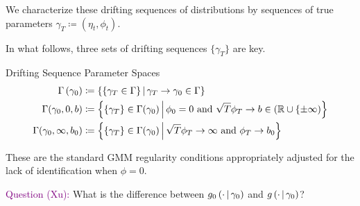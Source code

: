 \documentclass[11pt]{article}
\newcommand{\purple}[1]{\textcolor{purple}{#1}}
\newcommand*{\R}{\mathbb{R}}
\newcommand{\mvert}[1][\middle]{\ensuremath{\,#1\vert\,}}
\begin{document}
We characterize these drifting sequences of distributions by sequences of true parameters $\gamma_T \coloneqq
(\eta_t, \phi_t)$.

In what follows, three sets of drifting sequences $\lbrace \gamma_T \rbrace$ are key. 

\begin{defn}{Drifting Sequence Parameter Spaces}
    \begin{align}
        \Gamma\left(\gamma_0\right) &\coloneqq \left\lbrace \left\lbrace \gamma_T \in \Gamma \right\rbrace \mvert
            \gamma_T \to \gamma_0 \in \Gamma \right\rbrace\\ 
        \Gamma(\gamma_0, 0, b) &\coloneqq \left\lbrace \lbrace \gamma_T \rbrace \in \Gamma(\gamma_0) \mvert \phi_0 =
        0\ \text{and}\ \sqrt{T} \phi_T \to b \in (\R \cup \lbrace \pm \infty) \right\rbrace \\
        \Gamma(\gamma_0, \infty, b_0) &\coloneqq \left\lbrace \lbrace \gamma_T \rbrace \in \Gamma (\gamma_0) \mvert
        \sqrt{T} \phi_T \to \infty\ \text{and}\ \phi_T \to b_0 \right\rbrace 
    \end{align}
\end{defn}

These are the standard GMM regularity conditions appropriately adjusted for the lack of identification when $\phi
=0$.

\purple{Question (Xu):}
What is the difference between $g_0\left(\cdot \mvert \gamma_0\right)$ and $g\left(\cdot \mvert \gamma_0\right)$?
\end{document}
